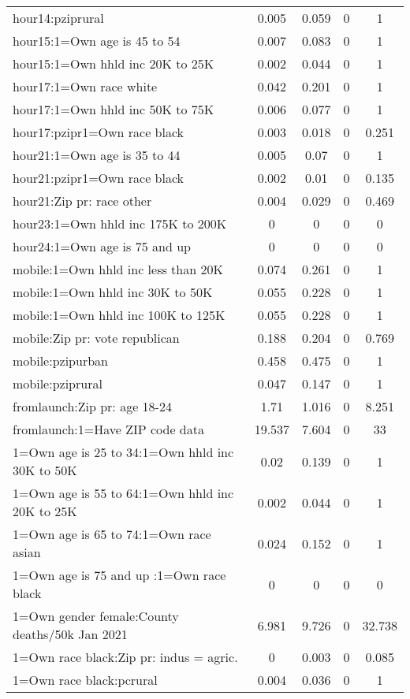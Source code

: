 {\begin{longtable}{l*{4}{c}}
 hour14:pziprural & 0.005 & 0.059 & 0 & 1  \\ 
 hour15:1=Own age is 45 to 54 & 0.007 & 0.083 & 0 & 1  \\ 
 hour15:1=Own hhld inc 20K to 25K & 0.002 & 0.044 & 0 & 1  \\ 
 hour17:1=Own race white & 0.042 & 0.201 & 0 & 1  \\ 
 hour17:1=Own hhld inc 50K to 75K & 0.006 & 0.077 & 0 & 1  \\ 
 hour17:pzipr1=Own race black & 0.003 & 0.018 & 0 & 0.251  \\ 
 hour21:1=Own age is 35 to 44 & 0.005 & 0.07 & 0 & 1  \\ 
 hour21:pzipr1=Own race black & 0.002 & 0.01 & 0 & 0.135  \\ 
 hour21:Zip pr: race other & 0.004 & 0.029 & 0 & 0.469  \\ 
 hour23:1=Own hhld inc 175K to 200K & 0 & 0 & 0 & 0  \\ 
 hour24:1=Own age is 75 and up  & 0 & 0 & 0 & 0  \\ 
 mobile:1=Own hhld inc less than 20K & 0.074 & 0.261 & 0 & 1  \\ 
 mobile:1=Own hhld inc 30K to 50K & 0.055 & 0.228 & 0 & 1  \\ 
 mobile:1=Own hhld inc 100K to 125K & 0.055 & 0.228 & 0 & 1  \\ 
 mobile:Zip pr: vote republican & 0.188 & 0.204 & 0 & 0.769  \\ 
 mobile:pzipurban & 0.458 & 0.475 & 0 & 1  \\ 
 mobile:pziprural & 0.047 & 0.147 & 0 & 1  \\ 
 fromlaunch:Zip pr: age 18-24 & 1.71 & 1.016 & 0 & 8.251  \\ 
 fromlaunch:1=Have ZIP code data & 19.537 & 7.604 & 0 & 33  \\ 
 1=Own age is 25 to 34:1=Own hhld inc 30K to 50K & 0.02 & 0.139 & 0 & 1  \\ 
 1=Own age is 55 to 64:1=Own hhld inc 20K to 25K & 0.002 & 0.044 & 0 & 1  \\ 
 1=Own age is 65 to 74:1=Own race asian & 0.024 & 0.152 & 0 & 1  \\ 
 1=Own age is 75 and up :1=Own race black & 0 & 0 & 0 & 0  \\ 
 1=Own gender female:County deaths/50k Jan 2021 & 6.981 & 9.726 & 0 & 32.738  \\ 
 1=Own race black:Zip pr: indus = agric. & 0 & 0.003 & 0 & 0.085  \\ 
 1=Own race black:pcrural & 0.004 & 0.036 & 0 & 1  \\ 

\end{longtable}}
